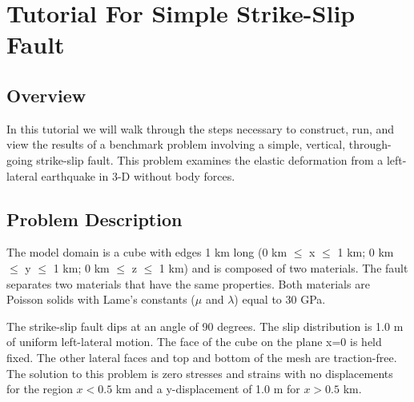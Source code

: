 \section{Tutorial For Simple Strike-Slip Fault}

\subsection{Overview}

In this tutorial we will walk through the steps necessary to
construct, run, and view the results of a benchmark problem involving
a simple, vertical, through-going strike-slip fault. This problem
examines the elastic deformation from a left-lateral earthquake in
3-D without body forces.

\subsection{Problem Description}

The model domain is a cube with edges 1 km long (0 km $\leq$ x $\leq$
1 km; 0 km $\leq$ y $\leq$ 1 km; 0 km $\leq$ z $\leq$ 1 km) and is
composed of two materials. The fault separates two materials that have
the same properties. Both materials are Poisson solids with Lame's
constants ($\mu$ and $\lambda$) equal to 30 GPa.

The strike-slip fault dips at an angle of 90 degrees. The slip
distribution is 1.0 m of uniform left-lateral motion. The face of the
cube on the plane x=0 is held fixed. The other lateral faces and top
and bottom of the mesh are traction-free. The solution to this problem
is zero stresses and strains with no displacements for the region
$x<0.5$ km and a y-displacement of 1.0 m for $x>0.5$ km.

